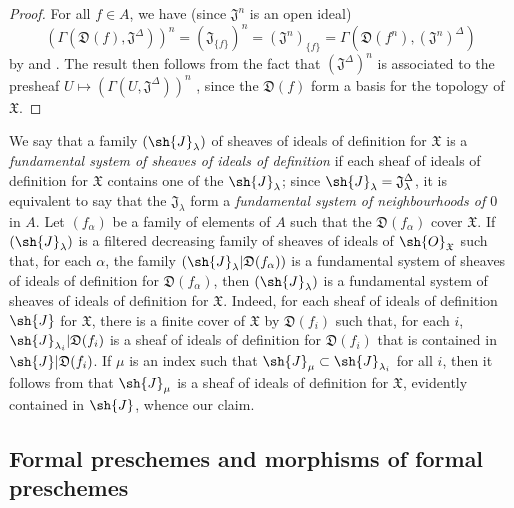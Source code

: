 \begin{proof}
For all $f\in A$, we have (since $\mathfrak{J}^n$ is an open ideal)
\[
  (\Gamma(\mathfrak{D}(f),\mathfrak{J}^\Delta))^n=(\mathfrak{J}_{\{f\}})^n=(\mathfrak{J}^n)_{\{f\}}=\Gamma(\mathfrak{D}(f^n),(\mathfrak{J}^n)^\Delta)
\]
by  and .
The result then follows from the fact that $(\mathfrak{J}^\Delta)^n$ is associated to the presheaf $U\mapsto(\Gamma(U,\mathfrak{J}^\Delta))^n$ , since the $\mathfrak{D}(f)$ form a basis for the topology of $\mathfrak{X}$.
\end{proof}

\begin{env}[10.3.7]
\label{I.10.3.7}
We say that a family $(\sh{J}_\lambda)$ of sheaves of ideals of definition for $\mathfrak{X}$ is a \emph{fundamental system of sheaves of ideals of definition} if each sheaf of ideals of definition for $\mathfrak{X}$ contains one of the $\sh{J}_\lambda$; since $\sh{J}_\lambda=\mathfrak{J}_\lambda^\Delta$, it is equivalent to say that the $\mathfrak{J}_\lambda$ form a \emph{fundamental system of neighbourhoods of $0$} in $A$.
Let $(f_\alpha)$ be a family of elements of $A$ such that the $\mathfrak{D}(f_\alpha)$ cover $\mathfrak{X}$.
If $(\sh{J}_\lambda)$ is a filtered decreasing family of sheaves of ideals of $\sh{O}_\mathfrak{X}$ such that, for each $\alpha$, the family $(\sh{J}_\lambda|\mathfrak{D}(f_\alpha))$ is a fundamental system of sheaves of ideals of definition for $\mathfrak{D}(f_\alpha)$, then $(\sh{J}_\lambda)$ is a fundamental system of sheaves of ideals of definition for $\mathfrak{X}$.
Indeed, for each sheaf of ideals of definition $\sh{J}$ for $\mathfrak{X}$, there is a finite cover of $\mathfrak{X}$ by $\mathfrak{D}(f_i)$ such that, for each $i$, $\sh{J}_{\lambda_i}|\mathfrak{D}(f_i)$ is a sheaf of ideals of definition for $\mathfrak{D}(f_i)$ that is contained in $\sh{J}|\mathfrak{D}(f_i)$.
If $\mu$ is an index such that $\sh{J}_\mu\subset\sh{J}_{\lambda_i}$ for all $i$, then it follows from  that $\sh{J}_\mu$ is a sheaf of ideals of definition for $\mathfrak{X}$, evidently contained in $\sh{J}$, whence our claim.
\end{env}

\subsection{Formal preschemes and morphisms of formal preschemes}
\label{subsection:I.10.4}

